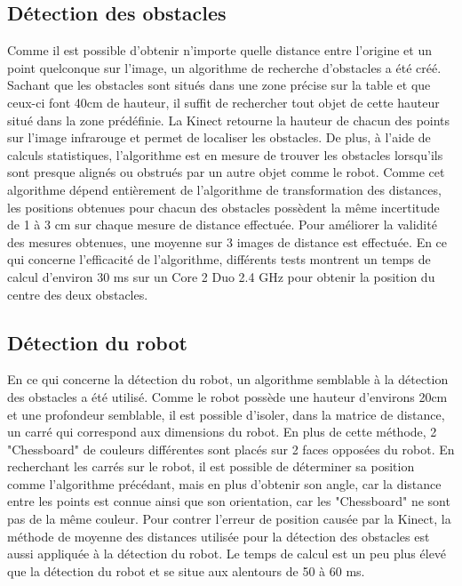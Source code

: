\subsection{Détection des obstacles}
Comme il est possible d'obtenir n'importe quelle distance entre l'origine et un point quelconque sur l'image, un algorithme de recherche d'obstacles a été créé. Sachant que les obstacles sont situés dans une zone précise sur la table et que ceux-ci font 40cm de hauteur, il suffit de rechercher tout objet de cette hauteur situé dans la zone prédéfinie. La Kinect retourne la hauteur de chacun des points sur l'image infrarouge et permet de localiser les obstacles. De plus, à l'aide de calculs statistiques, l'algorithme est en mesure de trouver les obstacles lorsqu'ils sont presque alignés ou obstrués par un autre objet comme le robot. Comme cet algorithme dépend entièrement de l'algorithme de transformation des distances, les positions obtenues pour chacun des obstacles possèdent la même incertitude de 1 à 3 cm sur chaque mesure de distance effectuée. Pour améliorer la validité des mesures obtenues, une moyenne sur 3 images de distance est effectuée. En ce qui concerne l'efficacité de l'algorithme, différents tests montrent un temps de calcul d'environ 30 ms sur un Core 2 Duo 2.4 GHz pour obtenir la position du centre des deux obstacles.

\subsection{Détection du robot}
En ce qui concerne la détection du robot, un algorithme semblable à la détection des obstacles a été utilisé. Comme le robot possède une hauteur d'environs 20cm et une profondeur semblable, il est possible d'isoler, dans la matrice de distance, un carré qui correspond aux dimensions du robot. En plus de cette méthode, 2 "Chessboard" de couleurs différentes sont placés sur 2 faces opposées du robot. En recherchant les carrés sur le robot, il est possible de déterminer sa position comme l'algorithme précédant, mais en plus d'obtenir son angle, car la distance entre les points est connue ainsi que son orientation, car les "Chessboard" ne sont pas de la même couleur. Pour contrer l'erreur de position causée par la Kinect, la méthode de moyenne des distances utilisée pour la détection des obstacles est aussi appliquée à la détection du robot. Le temps de calcul est un peu plus élevé que la détection du robot et se situe aux alentours de 50 à 60 ms. 